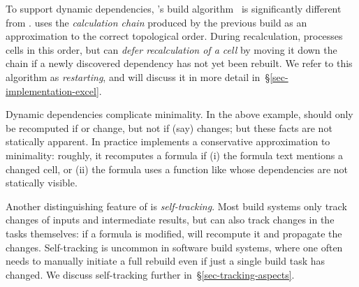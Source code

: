 To support dynamic dependencies,
\Excel's build algorithm~\cite{excel_recalc} is significantly different from
\Make. \Excel uses the \emph{calculation chain}
produced by the previous build as an approximation to the correct topological
order. During recalculation, \Excel processes cells in this order, but can
\emph{defer recalculation of a cell} by moving it down the chain if a newly
discovered dependency has not yet been rebuilt. We refer to this
algorithm as \emph{restarting}, and will discuss it in more detail
in~\S\ref{sec-implementation-excel}.

Dynamic dependencies complicate minimality.  In the above example, 
should only be recomputed if  or  change, but not if (say)
 changes; but these facts are not statically apparent. In practice
\Excel implements a conservative approximation to minimality: roughly, it
recomputes a formula if (i) the formula text mentions a changed cell, or (ii)
the formula uses a function like  whose dependencies are not
statically visible.

Another distinguishing feature of \Excel is \emph{self-tracking}. Most build
systems only track changes of inputs and intermediate results, but \Excel can
also track changes in the tasks themselves: if a formula is modified, \Excel
will recompute it and propagate the changes. Self-tracking is uncommon in
software build systems, where one often needs to manually initiate a full
rebuild even if just a single build task has changed. We discuss
self-tracking further in~\S\ref{sec-tracking-aspects}.

